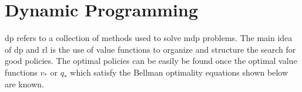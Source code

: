 \section{Dynamic Programming}
\gls{dp} refers to a collection of methods used to solve \gls{mdp} problems.
The main idea of \gls{dp} and \gls{rl} is the use of value functions to organize and structure the search for good policies.
The optimal policies can be easily be found once the optimal value functions $v_*$ or $q_*$ which satisfy the Bellman optimality equations shown below are known.

